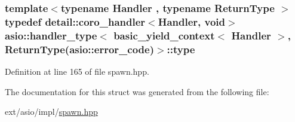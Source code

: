 \subsubsection[{type}]{\setlength{\rightskip}{0pt plus 5cm}template$<$typename Handler , typename Return\+Type $>$ typedef {\bf detail\+::coro\+\_\+handler}$<$Handler, void$>$ {\bf asio\+::handler\+\_\+type}$<$ {\bf basic\+\_\+yield\+\_\+context}$<$ Handler $>$,           Return\+Type({\bf asio\+::error\+\_\+code})$>$\+::{\bf type}}\label{structasio_1_1handler__type_3_01basic__yield__context_3_01_handler_01_4_00_01_01_01_01_01_01_01_4293f21a96d71a94577a209dcb83a1de_ac76d9787a62f2c5d51878a825a6fa194}


Definition at line 165 of file spawn.\+hpp.



The documentation for this struct was generated from the following file\+:\begin{DoxyCompactItemize}
\item 
ext/asio/impl/\hyperlink{impl_2spawn_8hpp}{spawn.\+hpp}\end{DoxyCompactItemize}
